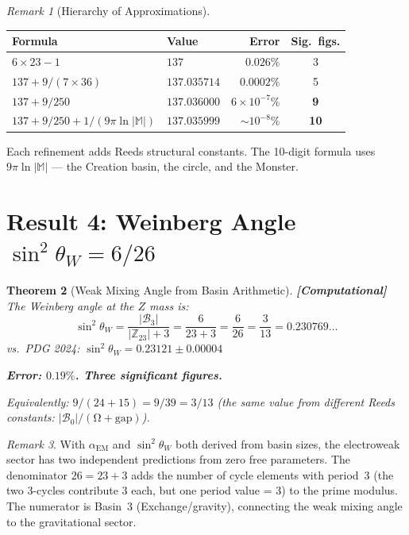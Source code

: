 \documentclass[12pt,a4paper]{article}
\newcommand{\computational}[1]{\textcolor{computational}{\textbf{[Computational]}} #1}
\newtheorem{theorem}{Theorem}[section]
\theoremstyle{definition}\newtheorem{definition}[theorem]{Definition}
\theoremstyle{remark}\newtheorem{remark}[theorem]{Remark}
\renewcommand{\O}{\mathrm{\Omega}}
\newcommand{\Zp}{\mathbb{Z}_{23}}
\newcommand{\Basin}{\mathcal{B}}
\begin{document}
\begin{remark}[Hierarchy of Approximations]
\begin{center}
\begin{tabular}{llrc}
\toprule
\textbf{Formula} & \textbf{Value} & \textbf{Error} & \textbf{Sig.\ figs.} \\
\midrule
$6 \times 23 - 1$ & $137$ & $0.026\%$ & 3 \\
$137 + 9/(7 \times 36)$ & $137.035714$ & $0.0002\%$ & 5 \\
$137 + 9/250$ & $137.036000$ & $6 \times 10^{-7}\%$ & \textbf{9} \\
$137 + 9/250 + 1/(9\pi\ln|\mathbb{M}|)$ & $137.035999$ & $\sim 10^{-8}\%$ & \textbf{10} \\
\bottomrule
\end{tabular}
\end{center}
Each refinement adds Reeds structural constants. The 10-digit formula uses
$9\pi\ln|\mathbb{M}|$ --- the Creation basin, the circle, and the Monster.
\end{remark}

\section{Result 4: Weinberg Angle $\sin^2\theta_W = 6/26$}
\label{sec:weinberg}

\begin{theorem}[Weak Mixing Angle from Basin Arithmetic]
\label{thm:weinberg}
\computational{The Weinberg angle at the $Z$ mass is:}
\begin{equation}
  \sin^2\theta_W = \frac{|\Basin_3|}{|\Zp| + 3}
  = \frac{6}{23 + 3} = \frac{6}{26} = \frac{3}{13} = 0.230769\ldots
\end{equation}
vs.\ PDG 2024: $\sin^2\theta_W = 0.23121 \pm 0.00004$

\textbf{Error: $0.19\%$. Three significant figures.}

Equivalently: $9/(24 + 15) = 9/39 = 3/13$ (the same value from different Reeds
constants: $|\Basin_0|/(\O + \text{gap})$).
\end{theorem}

\begin{remark}
With $\alpha_{\mathrm{EM}}$ and $\sin^2\theta_W$ both derived from basin sizes,
the electroweak sector has two independent predictions from zero free parameters.
The denominator $26 = 23 + 3$ adds the number of cycle elements with period~3
(the two 3-cycles contribute 3 each, but one period value = 3) to the prime
modulus. The numerator is Basin~3 (Exchange/gravity), connecting the weak mixing
angle to the gravitational sector.
\end{remark}
\end{document}
